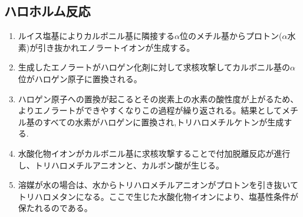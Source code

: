 \documentclass[dvipdfmx,uplatex]{jsarticle}
\begin{document}
\subsection{ハロホルム反応}
\begin{enumerate}
	\item ルイス塩基によりカルボニル基に隣接する$\alpha$位のメチル基からプロトン($\alpha$水素)が引き抜かれエノラートイオンが生成する。
	\item 生成したエノラートがハロゲン化剤に対して求核攻撃してカルボニル基の$\alpha$位がハロゲン原子に置換される。
	\item ハロゲン原子への置換が起こるとその炭素上の水素の酸性度が上がるため、よりエノラートができやすくなりこの過程が繰り返される。結果としてメチル基のすべての水素がハロゲンに置換され,トリハロメチルケトンが生成する.
	\item 水酸化物イオンがカルボニル基に求核攻撃することで付加脱離反応が進行し、トリハロメチルアニオンと、カルボン酸が生じる。
	\item 溶媒が水の場合は、水からトリハロメチルアニオンがプロトンを引き抜いてトリハロメタンになる。ここで生じた水酸化物イオンにより、塩基性条件が保たれるのである。
\end{enumerate}
\end{document}
